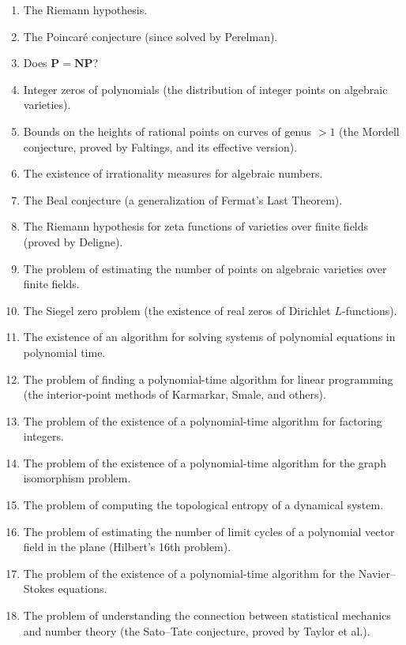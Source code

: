 \begin{enumerate}
    \item The Riemann hypothesis.
    \item The Poincar\'e conjecture (since solved by Perelman).
    \item Does \(\mathbf{P} = \mathbf{NP}\)?
    \item Integer zeros of polynomials (the distribution of integer points on algebraic varieties).
    \item Bounds on the heights of rational points on curves of genus \(> 1\) (the Mordell conjecture, proved by Faltings, and its effective version).
    \item The existence of irrationality measures for algebraic numbers.
    \item The Beal conjecture (a generalization of Fermat's Last Theorem).
    \item The Riemann hypothesis for zeta functions of varieties over finite fields (proved by Deligne).
    \item The problem of estimating the number of points on algebraic varieties over finite fields.
    \item The Siegel zero problem (the existence of real zeros of Dirichlet \(L\)-functions).
    \item The existence of an algorithm for solving systems of polynomial equations in polynomial time.
    \item The problem of finding a polynomial-time algorithm for linear programming (the interior-point methods of Karmarkar, Smale, and others).
    \item The problem of the existence of a polynomial-time algorithm for factoring integers.
    \item The problem of the existence of a polynomial-time algorithm for the graph isomorphism problem.
    \item The problem of computing the topological entropy of a dynamical system.
    \item The problem of estimating the number of limit cycles of a polynomial vector field in the plane (Hilbert's 16th problem).
    \item The problem of the existence of a polynomial-time algorithm for the Navier--Stokes equations.
    \item The problem of understanding the connection between statistical mechanics and number theory (the Sato--Tate conjecture, proved by Taylor et al.).
\end{enumerate}

